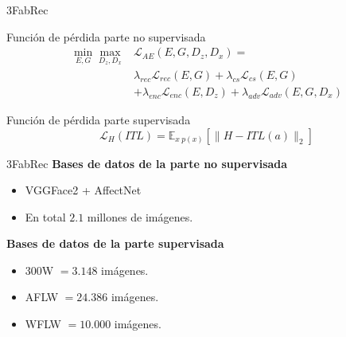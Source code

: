 \documentclass[aspectratio=43]{beamer}
\renewcommand{\cite}[1]{\footnote<.->[frame]{\fullcite{#1}}}
\begin{document}

\begin{frame}{3FabRec}
  \begin{block}{Función de pérdida parte no supervisada}
    \begin{align*}
      \min_{E,G} \max_{D_z,D_x} & \mathcal{L}_{AE}(E,G,D_z,D_x) = \\
      & \lambda_{rec} \mathcal{L}_{rec}(E,G) + \lambda_{cs}\mathcal{L}_{cs}(E,G) \\
      & + \lambda_{enc}\mathcal{L}_{enc}(E,D_z)+ \lambda_{adv} \mathcal{L}_{adv}(E,G,D_x)
    \end{align*}
  \end{block}
  \begin{block}{Función de pérdida parte supervisada}
    \begin{equation*}
      \mathcal{L}_H(ITL) = \mathbb{E}_{x ~ p(x)} \left[ \| H-ITL(a)\|_2 \right]
    \end{equation*}
  \end{block}
\end{frame}

\begin{frame}{3FabRec}
  \textcolor{tudCyan}{\textbf{Bases de datos de la parte no supervisada}}
  \begin{itemize}
    \item VGGFace2 + AffectNet
    \item En total $2.1$ millones de imágenes.
  \end{itemize}
  \textcolor{tudCyan}{\textbf{Bases de datos de la parte supervisada}}
  \begin{itemize}
    \item 300W $= 3.148$ imágenes.
    \item AFLW $= 24.386$ imágenes.
    \item WFLW $= 10.000$ imágenes.
  \end{itemize}
\end{frame}
\end{document}
